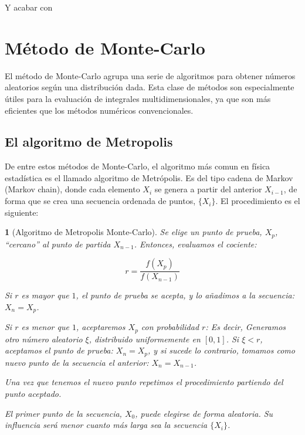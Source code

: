 \documentclass[11pt, a4paper]{article} %
\theoremstyle{named}
\newtheorem*{namedtheorem}{}
\begin{document}
Y acabar con

\newpage
\appendix
\section{Método de Monte-Carlo}\label{sec:monteC}

El método de Monte-Carlo agrupa una serie de algoritmos para obtener números aleatorios según una distribución dada. Esta clase de métodos son especialmente útiles para la evaluación de integrales multidimensionales, ya que son más eficientes que los métodos numéricos convencionales.

\subsection{El algoritmo de Metropolis}\label{sec:metropolis}

De entre estos métodos de Monte-Carlo, el algoritmo más comun en física estadística es el llamado algoritmo de Metrópolis. Es del tipo cadena de Markov (Markov chain), donde cada elemento $X_i$ se genera a partir del anterior $X_{i-1}$, de forma que se crea una secuencia ordenada de puntos, $\{X_i\}$. El procedimiento es el siguiente:

\begin{namedtheorem}[Algoritmo de Metropolis Monte-Carlo]
Se elige un punto de prueba, $X_{p}$, ``cercano'' al punto de partida $X_{n-1}$. Entonces, evaluamos el cociente:

\begin{equation}\label{eq:metropCoci}
r= \frac{f(X_p)}{f(X_{n-1})}
\end{equation}

Si $r$ es mayor que $1$, el punto de prueba se acepta, y lo añadimos a la secuencia: $X_{n} = X_p$.

Si $r$ es menor que $1$, aceptaremos $X_p$ con probabilidad $r$: Es decir, Generamos otro número aleatorio $\xi$, distribuido uniformemente en $[0,1]$. Si $\xi < r$, aceptamos el punto de prueba: $X_{n} = X_p$, y si sucede lo contrario, tomamos como nuevo punto de la secuencia el anterior: $X_{n} = X_{n-1}$.

Una vez que tenemos el nuevo punto repetimos el procedimiento partiendo del punto aceptado.

El primer punto de la secuencia, $X_0$, puede elegirse de forma aleatoria. Su influencia será menor cuanto más larga sea la secuencia $\{X_i\}$.
\end{namedtheorem}
\end{document}
